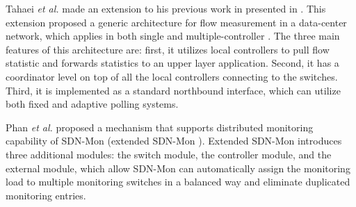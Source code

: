 Tahaei \textit{et al.} made an extension to his previous work in presented in \cite{tahaei_2017:multi-objective}. This extension proposed a generic architecture for flow measurement in a data-center network, which applies in both single and multiple-controller \cite{tahaei_2018:cost_effective}. The three main features of this architecture are: first, it utilizes local controllers to pull flow statistic and forwards statistics to an upper layer application. Second, it has a coordinator level on top of all the local controllers connecting to the switches. Third, it is implemented as a standard northbound interface, which can utilize both fixed and adaptive polling systems.

Phan \textit{et al.} proposed a mechanism that supports distributed monitoring capability of SDN-Mon (extended SDN-Mon \cite{phan2017:adaptive_sdn_mon}). Extended SDN-Mon introduces three additional modules: the switch module, the controller module, and the external module, which allow SDN-Mon can automatically assign the monitoring load to multiple monitoring switches in a balanced way and eliminate duplicated monitoring entries.

\newcommand{\fcwidth}{3.2cm}
\newcommand{\scwidth}{6.9cm}
\newcommand{\tcwidth}{6.9cm}

